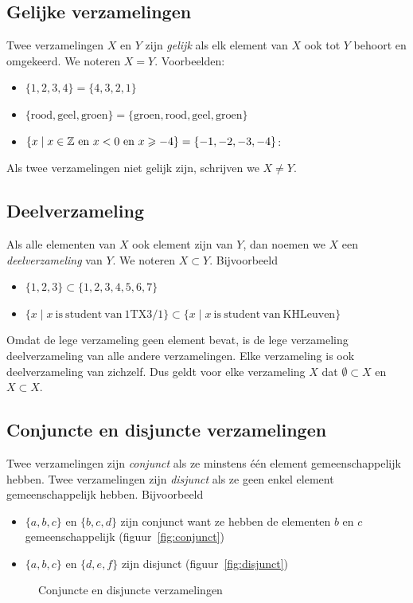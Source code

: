 \subsection{Gelijke verzamelingen}
Twee verzamelingen $X$ en $Y$ zijn \emph{gelijk} als elk element van $X$ ook tot $Y$ behoort en omgekeerd. We noteren $X=Y$. Voorbeelden:
\begin{itemize}
\item $\{1,2,3,4 \}=\{4,3,2,1 \}$
\item $\{\mathrm{rood, geel, groen} \}=\{\mathrm{groen, rood, geel, groen} \}$
\item $\{x\mid x \in \mathbb{Z} ~\mathrm{ en }~ x<0 ~\mathrm{ en }~ x\geqslant -4\}=\{-1,-2,-3,-4 \}$:
\end{itemize}
Als twee verzamelingen niet gelijk zijn, schrijven we $X \not = Y$.

\subsection{Deelverzameling}
Als alle elementen van $X$ ook element zijn van $Y$, dan noemen we $X$ een \emph{deelverzameling} van $Y$. We noteren $X\subset Y$. Bijvoorbeeld
\begin{itemize}
\item $\{1,2,3 \}\subset \{ 1,2,3,4,5,6,7 \}$
\item $\{x \mid x ~\mathrm{is~student~van~1TX3/1} \} \subset \{x \mid x ~\mathrm{is~student~van~KHLeuven} \}$
\end{itemize}

Omdat de lege verzameling geen element bevat, is de lege verzameling  deelverzameling van alle andere verzamelingen. Elke verzameling is ook deelverzameling van zichzelf. Dus geldt voor elke verzameling $X$ dat $\emptyset \subset X$ en $X \subset X$.

\subsection{Conjuncte en disjuncte verzamelingen}
Twee verzamelingen zijn \emph{conjunct} als ze minstens \'e\'en element gemeenschappelijk hebben.
Twee verzamelingen zijn \emph{disjunct} als ze geen enkel element gemeenschappelijk hebben. Bijvoorbeeld
\begin{itemize}
  \item $\{ a, b, c \}$ en $\{ b, c, d \}$ zijn conjunct want ze hebben de elementen $b$ en $c$ gemeenschappelijk (figuur~\ref{fig:conjunct}) 
  \item  $\{ a, b, c \}$ en $\{ d, e, f \}$ zijn disjunct (figuur~\ref{fig:disjunct})
\end{itemize}
\begin{figure}
  \centering
  \qquad
  \caption{Conjuncte en disjuncte verzamelingen}
  \label{fig:conjunct-disjunct}
\end{figure}

